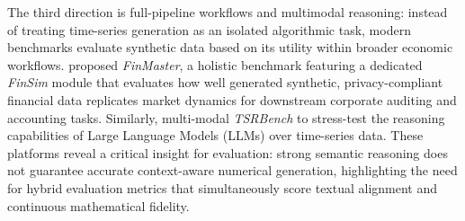 The third direction is full-pipeline workflows and multimodal reasoning: instead of treating time-series generation as an isolated algorithmic task, modern benchmarks evaluate synthetic data based on its utility within broader economic workflows. \citep{finmaster2025} proposed \textit{FinMaster}, a holistic benchmark featuring a dedicated \textit{FinSim} module that evaluates how well generated synthetic, privacy-compliant financial data replicates market dynamics for downstream corporate auditing and accounting tasks. Similarly, multi-modal \textit{TSRBench} to stress-test the reasoning capabilities of Large Language Models (LLMs) over time-series data. These platforms reveal a critical insight for evaluation: strong semantic reasoning does not guarantee accurate context-aware numerical generation, highlighting the need for hybrid evaluation metrics that simultaneously score textual alignment and continuous mathematical fidelity.

